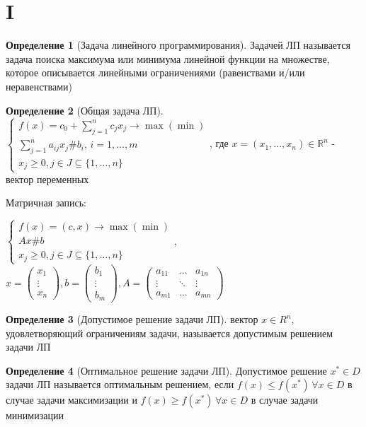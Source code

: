 \documentclass[a4paper]{article}
\theoremstyle{definition}
\newtheorem*{definition}{Определение}
\theoremstyle{remark}
\begin{document}
\section{I}
\begin{definition}[Задача линейного программирования]
	Задачей ЛП называется задача поиска максимума или минимума линейной функции
	на множестве, которое описывается линейными ограничениями (равенствами и/или неравенствами)

\end{definition}
\begin{definition}[Общая задача ЛП]
	$    \begin{cases}
			f(x) = c_0 + \sum_{j = 1}^n c_j x_j \to \max (\min)   \\
			\sum_{j = 1}^{n} a_{ij}x_j \# b_i, \, i = 1, \dots, m \\
			x_j \geq 0, j \in J\subseteq \{1, \dots, n\}
		\end{cases}$, где \(x = (x_1, ..., x_n)\in \mathbb{R}^n\) -  вектор переменных

	Матричная запись:

	$\begin{cases}
			f(x) = (c, x) \to \max(\min) \\
			Ax \# b                      \\
			x_j \geq 0, j \in J\subseteq \{1, \dots, n\}
		\end{cases}$, $x = \begin{pmatrix}
			x_1 \\ \vdots \\ x_n
		\end{pmatrix}, b = \begin{pmatrix}
			b_1 \\ \vdots \\ b_m
		\end{pmatrix},
		A = \begin{pmatrix}
			a_{11} & \dots  & a_{1n} \\
			\vdots & \ddots & \vdots \\
			a_{m1} & \dots  & a_{mn}
		\end{pmatrix}$
\end{definition}
\begin{definition}[Допустимое решение задачи ЛП]
	вектор $x\in R^n$, удовлетворяющий ограничениям задачи, называется допустимым решением задачи ЛП	
\end{definition}
\begin{definition}[Оптимальное решение задачи ЛП]
	Допустимое решение $x^*\in D$ задачи ЛП называется оптимальным решением, если $f(x) \leq f(x^*) \, \forall x\in D$ в случае задачи максимизации и $f(x) \geq f(x^*) \, \forall x\in D$ в случае задачи минимизации
\end{definition}
\end{document}
